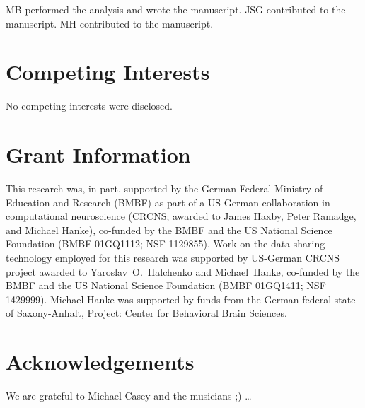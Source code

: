 MB performed the analysis and wrote the manuscript.
JSG contributed to the manuscript.
MH contributed to the manuscript.


\section*{Competing Interests}

No competing interests were disclosed.

\section*{Grant Information}

This research was, in part, supported by the German Federal Ministry of
Education and Research (BMBF) as part of a US-German collaboration in
computational neuroscience (CRCNS; awarded to James Haxby, Peter Ramadge, and
Michael Hanke), co-funded by the BMBF and the US National Science Foundation
(BMBF 01GQ1112; NSF 1129855).  Work on the data-sharing technology employed for
this research was supported by US-German CRCNS project awarded to
Yaroslav~O.~Halchenko and Michael~Hanke, co-funded by the BMBF and the US
National Science Foundation (BMBF 01GQ1411; NSF 1429999).  Michael Hanke was
supported by funds from the German federal state of Saxony-Anhalt, Project:
Center for Behavioral Brain Sciences.


\section*{Acknowledgements}

We are grateful to Michael Casey and the musicians ;) \ldots
{}





